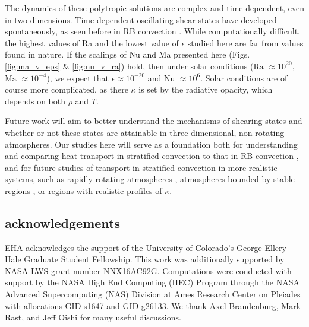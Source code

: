 \documentclass[aps, prl, twocolumn, nofootinbib, groupedaddress, amsfonts, amssymb, amsmath]{revtex4-1}
\begin{document}
The dynamics of these polytropic solutions are complex and time-dependent, even in two dimensions.
Time-dependent oscillating shear states have developed spontaneously, as seen before in RB convection
\cite{goluskin&all2014}.  While computationally difficult, the highest values of Ra and the lowest value
of $\epsilon$ studied here are far from values found in nature.  If the scalings of Nu and Ma
presented here (Figs. \ref{fig:ma_v_eps} \& \ref{fig:nu_v_ra}) hold, then under solar conditions ($\text{Ra }\approx 10^{20}$, $\text{Ma }\approx 10^{-4}$), we expect that $\epsilon \approx 10^{-20}$ and
$\text{Nu }\approx 10^{6}$.  
Solar conditions are of course more complicated, as there $\kappa$ is
set by the radiative opacity, which depends on both $\rho$ and $T$.

Future work will aim to better understand the mechanisms of shearing states and
whether or not these states are attainable in three-dimensional, non-rotating atmospheres.  Our studies
here will serve as a foundation both for understanding and comparing heat transport in stratified convection
to that in RB convection \cite{johnston&doering2009}, and for future studies of transport in stratified
convection in more realistic systems, such as rapidly rotating atmospheres \cite{julien&all2016},
atmospheres bounded by stable regions \cite{hurlburt&all1986}, 
or regions with realistic profiles of $\kappa$.



\subsection{acknowledgements}
EHA acknowledges the support of the University of Colorado's George 
Ellery Hale Graduate Student Fellowship.
This work was additionally supported by  NASA LWS grant number NNX16AC92G.  
Computations were conducted 
with support by the NASA High End Computing (HEC) Program through the NASA 
Advanced Supercomputing (NAS) Division at Ames Research Center on Pleiades
with allocations GID s1647 and GID g26133.
We thank Axel Brandenburg, Mark Rast, and Jeff Oishi for many useful discussions.


\end{document}
